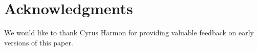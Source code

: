 \section{Acknowledgments} 

We would like to thank Cyrus Harmon for providing valuable feedback on
early versions of this paper.

